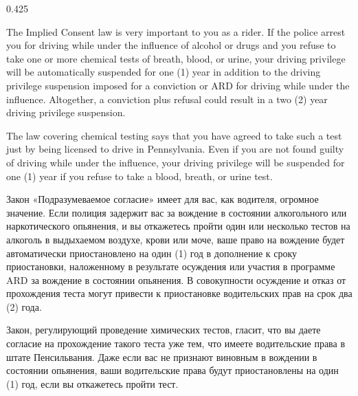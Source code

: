 \begin{langblock}{0.425}
	\begin{eng}
	
	The Implied Consent law is very important to you as a rider.  If the police arrest you for driving while under the influence of alcohol or drugs and you refuse to take one or more chemical tests of breath, blood, or urine, your driving privilege will be automatically suspended for one (1) year in addition to the driving privilege suspension imposed for a conviction or ARD for driving while under the influence. Altogether, a conviction plus refusal could result in a two (2) year driving privilege suspension.
	
	The law covering chemical testing says that you have agreed to take such a test just by being licensed to drive in Pennsylvania.  Even if you are not found guilty of driving while under the influence, your driving privilege will be suspended for one (1) year if you refuse to take a blood, breath, or urine test.
	\end{eng}
	\begin{rus}
		
		Закон «Подразумеваемое согласие» имеет для вас, как водителя, огромное значение. Если полиция задержит вас за вождение в состоянии алкогольного или наркотического опьянения, и вы откажетесь пройти один или несколько тестов на алкоголь в выдыхаемом воздухе, крови или моче, ваше право на вождение будет автоматически приостановлено на один (1) год в дополнение к сроку приостановки, наложенному в результате осуждения или участия в программе ARD за вождение в состоянии опьянения. В совокупности осуждение и отказ от прохождения теста могут привести к приостановке водительских прав на срок два (2) года.
		
		Закон, регулирующий проведение химических тестов, гласит, что вы даете согласие на прохождение такого теста уже тем, что имеете водительские права в штате Пенсильвания.  Даже если вас не признают виновным в вождении в состоянии опьянения, ваши водительские права будут приостановлены на один (1) год, если вы откажетесь пройти тест.
\end{rus}
\end{langblock}






